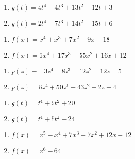 \documentclass{ximera}
\begin{document}
\begin{multicols}{2}
\begin{enumerate}
\setcounter{enumi}{\value{HW}}

\item $g(t) = 4t^{4} - 4t^{3} + 13t^{2} - 12t + 3$
\item $g(t) = 2t^4-7t^3+14t^2-15t+6$

\setcounter{HW}{\value{enumi}}
\end{enumerate}
\end{multicols}

\begin{multicols}{2}
\begin{enumerate}
\setcounter{enumi}{\value{HW}}

\item  $f(x) = x^4+x^3+7x^2+9x-18$
\item  $f(x) = 6x^4+17x^3-55x^2+16x+12$


\setcounter{HW}{\value{enumi}}
\end{enumerate}
\end{multicols}


\begin{multicols}{2}
\begin{enumerate}
\setcounter{enumi}{\value{HW}}

\item  $p(z) = -3z^4-8z^3-12z^2-12z-5$
\item  $p(z) = 8z^4+50z^3+43z^2+2z-4$


\setcounter{HW}{\value{enumi}}
\end{enumerate}
\end{multicols}

\begin{multicols}{2}
\begin{enumerate}
\setcounter{enumi}{\value{HW}}

\item $g(t) = t^4+9t^2+20$
\item $g(t) = t^4 + 5t^2 - 24$

\setcounter{HW}{\value{enumi}}
\end{enumerate}
\end{multicols}

\begin{multicols}{2}
\begin{enumerate}
\setcounter{enumi}{\value{HW}}

\item  $f(x) = x^5 - x^4+7x^3-7x^2+12x-12$
\item $f(x) = x^6-64$


\setcounter{HW}{\value{enumi}}
\end{enumerate}
\end{multicols}
\end{document}
